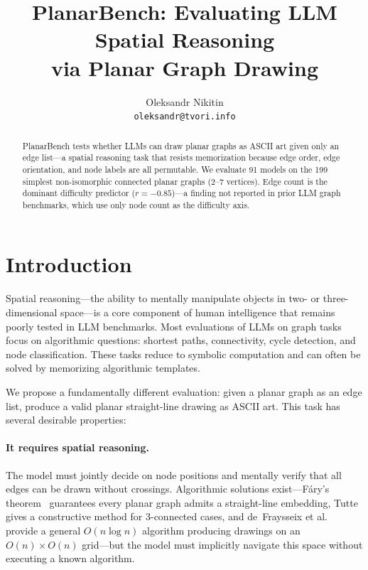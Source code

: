 \documentclass{article}
\title{PlanarBench: Evaluating LLM Spatial Reasoning\\ via Planar Graph Drawing}
\author{%
  Oleksandr Nikitin \\
  \texttt{oleksandr@tvori.info}
}
\begin{document}
\maketitle

\begin{abstract}
PlanarBench tests whether LLMs can draw planar graphs as ASCII art given only an edge list---a spatial reasoning task that resists memorization because edge order, edge orientation, and node labels are all permutable. We evaluate 91 models on the 199 simplest non-isomorphic connected planar graphs (2--7 vertices). Edge count is the dominant difficulty predictor ($r = -0.85$)---a finding not reported in prior LLM graph benchmarks, which use only node count as the difficulty axis.
\end{abstract}

\section{Introduction}

Spatial reasoning---the ability to mentally manipulate objects in two- or three-dimensional space---is a core component of human intelligence that remains poorly tested in LLM benchmarks. Most evaluations of LLMs on graph tasks focus on algorithmic questions: shortest paths, connectivity, cycle detection, and node classification. These tasks reduce to symbolic computation and can often be solved by memorizing algorithmic templates.

We propose a fundamentally different evaluation: given a planar graph as an edge list, produce a valid planar straight-line drawing as ASCII art. This task has several desirable properties:

\paragraph{It requires spatial reasoning.}
The model must jointly decide on node positions and mentally verify that all edges can be drawn without crossings. Algorithmic solutions exist---F\'ary's theorem~\citep{fary1948} guarantees every planar graph admits a straight-line embedding, Tutte~\citep{tutte1963} gives a constructive method for 3-connected cases, and de~Fraysseix et al.~\citep{defraysseix1990} provide a general $O(n \log n)$ algorithm producing drawings on an $O(n) \times O(n)$ grid---but the model must implicitly navigate this space without executing a known algorithm.
\end{document}
